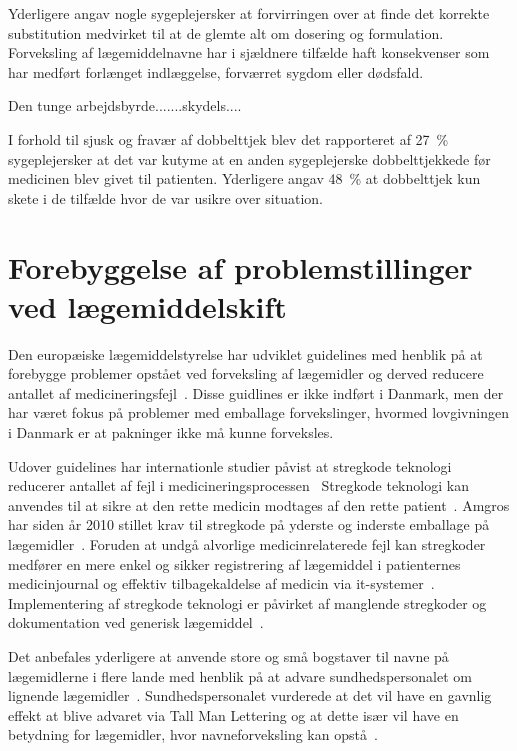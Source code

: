 Yderligere angav nogle sygeplejersker at forvirringen over at finde det korrekte substitution medvirket til at de glemte alt om dosering og formulation. Forveksling af lægemiddelnavne har i sjældnere tilfælde haft konsekvenser som har medført forlænget indlæggelse, forværret sygdom eller dødsfald.~\citep{DanskSelskabforPatientsikkerhed2009}


Den tunge arbejdsbyrde.......skydels....

I forhold til sjusk og fravær af dobbelttjek blev det rapporteret af 27~\% sygeplejersker at det var kutyme at en anden sygeplejerske dobbelttjekkede før medicinen blev givet til patienten. Yderligere angav 48~\% at dobbelttjek kun skete i de tilfælde hvor de var usikre over situation. 

\section{Forebyggelse af problemstillinger ved lægemiddelskift}
Den europæiske lægemiddelstyrelse har udviklet guidelines med henblik på at forebygge problemer opstået ved forveksling af lægemidler og derved reducere antallet af medicineringsfejl~\citep{DanskSelskabforPatientsikkerhed2009}. Disse guidlines er ikke indført i Danmark, men der har været fokus på problemer med emballage forvekslinger, hvormed lovgivningen i Danmark er at pakninger ikke må kunne forveksles.   

Udover guidelines har internationle studier påvist at stregkode teknologi reducerer antallet af fejl i medicineringsprocessen~\citep{Poon2006, Levtzion-korach2010} Stregkode teknologi kan anvendes til at sikre at den rette medicin modtages af den rette patient~\citep{Amgros2013}.  
Amgros har siden år 2010 stillet krav til stregkode på yderste og inderste emballage på lægemidler~\citep{Amgros2013}. Foruden at undgå alvorlige medicinrelaterede fejl kan stregkoder medfører en mere enkel og sikker registrering af lægemiddel i patienternes medicinjournal og effektiv tilbagekaldelse af medicin via it-systemer~\citep{Amgros2013}. Implementering af stregkode teknologi er påvirket af manglende stregkoder og dokumentation ved generisk lægemiddel~\citep{Amgros2013}.

Det anbefales yderligere at anvende store og små bogstaver til navne på lægemidlerne i flere lande med henblik på at advare sundhedspersonalet om lignende lægemidler~\citep{ISMP2011,HQSC2013,ACSQ2011}. Sundhedspersonalet vurderede at det vil have en gavnlig effekt at blive advaret via Tall Man Lettering og at dette især vil have en betydning for lægemidler, hvor navneforveksling kan opstå~\citep{Campmans2018}.

